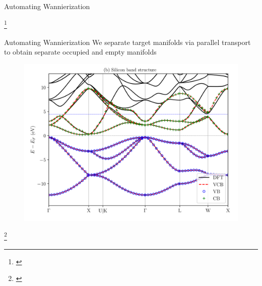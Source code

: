 \documentclass[xcolor=table,aspectratio=169]{beamer}
\newcommand\blfootcite[1]{%
  \begingroup
  \renewcommand\thefootnote{}\footnote{\hspace{-4ex}\cite{#1}}%
  \addtocounter{footnote}{-1}%
  \endgroup
}
\numberwithin{equation}{section}
\begin{document}
\begin{frame}{Automating Wannierization}
\begin{figure}[t]
\begin{subfigure}{0.2\textwidth}
      \end{subfigure}
   \end{figure}

   \blfootcite{Qiao2023}

\end{frame}

\begin{frame}{Automating Wannierization}
   We separate target manifolds via parallel transport to obtain separate occupied and empty manifolds

      \begin{figure}
         \includegraphics[width=0.3\columnwidth]{figures/target_manifolds_fig1b.png}
      \end{figure}

   \blfootcite{Qiao2023a}

\end{frame}
\end{document}
